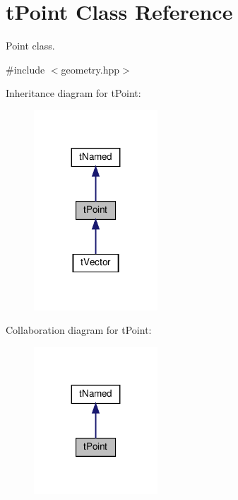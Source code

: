 \hypertarget{classtPoint}{}\section{t\+Point Class Reference}
\label{classtPoint}


Point class.  




{\ttfamily \#include $<$geometry.\+hpp$>$}



Inheritance diagram for t\+Point\+:
\nopagebreak
\begin{figure}[H]
\begin{center}
\leavevmode
\includegraphics[width=131pt]{classtPoint__inherit__graph}
\end{center}
\end{figure}


Collaboration diagram for t\+Point\+:
\nopagebreak
\begin{figure}[H]
\begin{center}
\leavevmode
\includegraphics[width=131pt]{classtPoint__coll__graph}
\end{center}
\end{figure}
